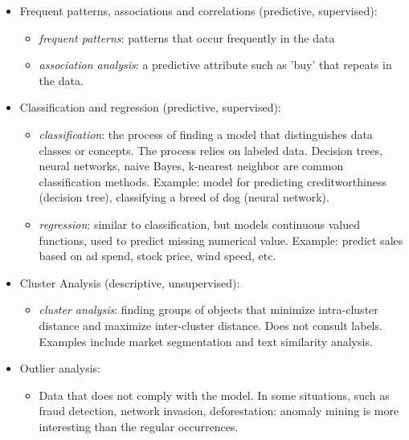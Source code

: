 \documentclass[11pt]{article}
\providecommand{\tightlist}{%
      \setlength{\itemsep}{0pt}\setlength{\parskip}{0pt}}
\begin{document}
    \begin{itemize}
\tightlist
\item
  Frequent patterns, associations and correlations (predictive,
  supervised):

  \begin{itemize}
  \tightlist
  \item
    \emph{frequent patterns}: patterns that occur frequently in the data
  \item
    \emph{association analysis}: a predictive attribute such as 'buy'
    that repeats in the data.
  \end{itemize}
\end{itemize}

    \begin{itemize}
\tightlist
\item
  Classification and regression (predictive, supervised):

  \begin{itemize}
  \tightlist
  \item
    \emph{classification}: the process of finding a model that
    distinguishes data classes or concepts. The process relies on
    labeled data. Decision trees, neural networks, naive Bayes,
    k-nearest neighbor are common classification methods. Example: model
    for predicting creditworthiness (decision tree), classifying a breed
    of dog (neural network).
  \item
    \emph{regression}: similar to classification, but models continuous
    valued functions, used to predict missing numerical value. Example:
    predict sales based on ad spend, stock price, wind speed, etc.
  \end{itemize}
\end{itemize}

    \begin{itemize}
\tightlist
\item
  Cluster Analysis (descriptive, unsupervised):

  \begin{itemize}
  \tightlist
  \item
    \emph{cluster analysis}: finding groups of objects that minimize
    intra-cluster distance and maximize inter-cluster distance. Does not
    consult labels. Examples include market segmentation and text
    similarity analysis.
  \end{itemize}
\end{itemize}

    \begin{itemize}
\tightlist
\item
  Outlier analysis:

  \begin{itemize}
  \tightlist
  \item
    Data that does not comply with the model. In some situations, such
    as fraud detection, network invasion, deforestation: anomaly mining
    is more interesting than the regular occurrences.
  \end{itemize}
\end{itemize}
\end{document}
